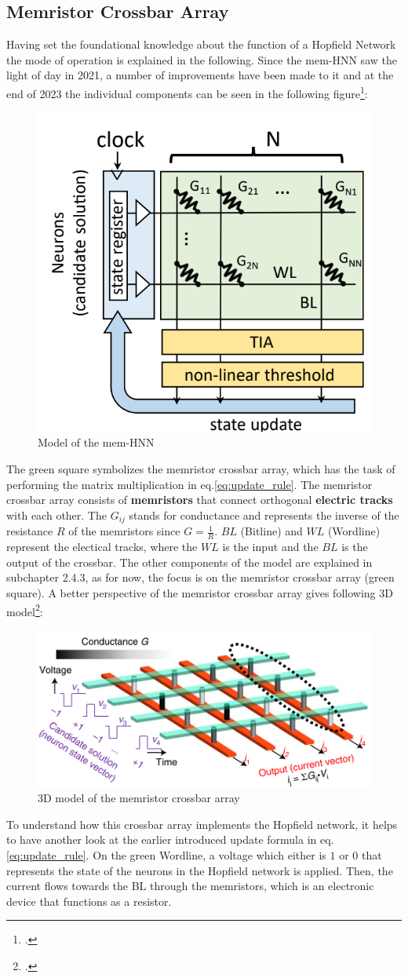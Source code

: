 \subsection{Memristor Crossbar Array}

Having set the foundational knowledge about the function of a Hopfield Network the mode of operation is explained in the following. 
Since the \ac{mem-HNN} saw the light of day in 2021, a number of improvements have been made to it and at the end of 2023 the individual components can be seen in the following figure\footcite[cf.][2]{hizzaniMemristorbasedHardwareAlgorithms2023}:
\begin{figure}[H]
    \centering
    \includegraphics[width=0.3\linewidth]{graphics/Mem_HNN_Modell.png}
    \caption{Model of the mem-HNN}
    \label{ModellHMM}
\end{figure}
The green square symbolizes the memristor crossbar array, which has the task of performing the matrix multiplication in eq.\eqref{eq:update_rule}. 
The memristor crossbar array consists of \textbf{memristors} that connect orthogonal \textbf{electric tracks} with each other.
The \( G_{ij} \) stands for conductance and represents the inverse of the resistance \( R \) of the memristors since \( G = \frac{1}{R}\).
\( BL \) (Bitline) and \( WL \) (Wordline) represent the electical tracks, where the \( WL \) is the input and the \( BL \) is the output of the crossbar.
The other components of the model are explained in subchapter 2.4.3, as for now, the focus is on the memristor crossbar array (green square).
A better perspective of the memristor crossbar array gives following 3D model\footcite[cf.][410]{caiPowerefficientCombinatorialOptimization2020}:
\begin{figure}[H]
    \centering
    \includegraphics[width=0.65\linewidth]{graphics/memristor_crossbar_array.png}
    \caption{3D model of the memristor crossbar array}
\end{figure}
To understand how this crossbar array implements the Hopfield network, it helps to have another look at the earlier introduced update formula in eq.\eqref{eq:update_rule}.
On the green Wordline, a voltage which either is \( 1 \) or \( 0 \) that represents the state of the neurons in the Hopfield network is applied.
Then, the current flows towards the BL through the memristors, which is an electronic device that functions as a resistor.

